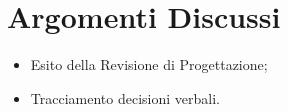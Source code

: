 \section{Argomenti Discussi}
	\begin{itemize}
		\item Esito della Revisione di Progettazione;
		\item Tracciamento decisioni verbali.
	\end{itemize}
